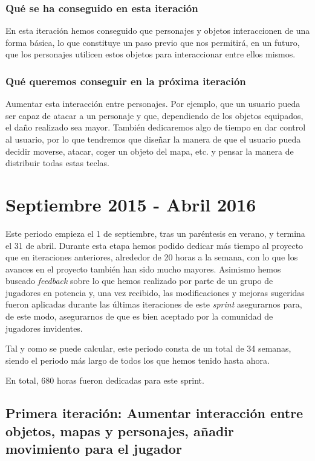 \subsubsection{Qué se ha conseguido en esta iteración}

En esta iteración hemos conseguido que personajes y objetos interaccionen de una forma básica, lo que constituye un paso previo que nos permitirá, en un futuro, que los personajes utilicen estos objetos para interaccionar entre ellos mismos.

\subsubsection{Qué queremos conseguir en la próxima iteración}

Aumentar esta interacción entre personajes. Por ejemplo, que un usuario pueda ser capaz de atacar a un personaje y que, dependiendo de los objetos equipados, el daño realizado sea mayor. 
También dedicaremos algo de tiempo en dar control al usuario, por lo que tendremos que diseñar la manera de que el usuario pueda decidir moverse, atacar, coger un objeto del mapa, etc. y pensar la manera de distribuir todas estas teclas.

\section{Septiembre 2015 - Abril 2016}

Este periodo empieza el 1 de septiembre, tras un paréntesis en verano, y termina el 31 de abril. Durante esta etapa hemos podido dedicar más tiempo al proyecto que en iteraciones anteriores, alrededor de 20 horas a la semana, con lo que los avances en el proyecto también han sido mucho mayores. Asimismo hemos buscado \textit{feedback} sobre lo que hemos realizado por parte de un grupo de jugadores en potencia y, una vez recibido, las modificaciones y mejoras sugeridas fueron aplicadas durante las últimas iteraciones de este \textit{sprint} asegurarnos para, de este modo, asegurarnos de que es bien aceptado por la comunidad de jugadores invidentes.

Tal y como se puede calcular, este periodo consta de un total de 34 semanas, siendo el periodo más largo de todos los que hemos tenido hasta ahora.

En total, 680 horas fueron dedicadas para este sprint.

\subsection{Primera iteración: Aumentar interacción entre objetos, mapas y personajes, añadir movimiento para el jugador}

